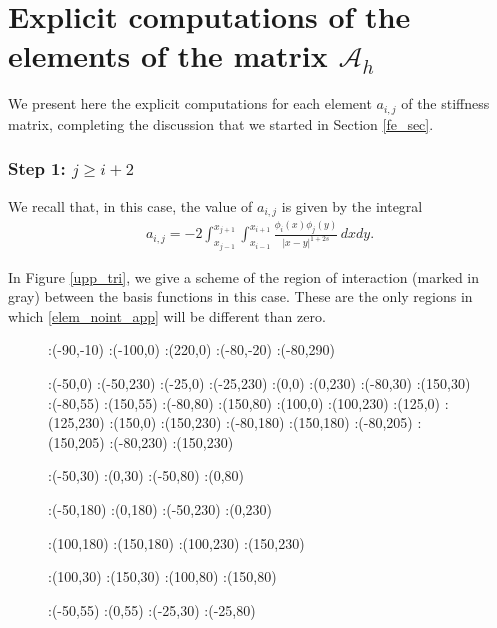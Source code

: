 {\appendix

\section{Explicit computations of the elements of the matrix $\mathcal A_h$}\label{appendix}

We present here the explicit computations for each element $a_{i,j}$ of the stiffness matrix, completing the discussion that we started in Section \ref{fe_sec}.

\subsubsection*{Step 1: $j\geq i+2$}
We recall that, in this case, the value of $a_{i,j}$ is given by the integral
\begin{align}\label{elem_noint_app}
	a_{i,j}=-2 \int_{x_{j-1}}^{x_{j+1}}\int_{x_{i-1}}^{x_{i+1}}\frac{\phi_i(x)\phi_j(y)}{|x-y|^{1+2s}}\,dxdy.
\end{align}

In Figure \ref{upp_tri}, we give a scheme of the region of interaction (marked in gray) between the basis functions in this case. These are the only regions in which \eqref{elem_noint_app} will be different than zero.
\begin{figure}[h]
\figinit{0.7pt}
:(-90,-10)
:(-100,0) :(220,0)
:(-80,-20) :(-80,290)

:(-50,0) :(-50,230)
:(-25,0) :(-25,230)
:(0,0) :(0,230)
%
:(-80,30) :(150,30)
:(-80,55) :(150,55)
:(-80,80) :(150,80)
%
:(100,0) :(100,230)
:(125,0) :(125,230)
:(150,0) :(150,230)
%
:(-80,180) :(150,180)
:(-80,205) :(150,205)
:(-80,230) :(150,230)

:(-50,30) :(0,30)
:(-50,80) :(0,80)

:(-50,180) :(0,180)
:(-50,230) :(0,230)

:(100,180) :(150,180)
:(100,230) :(150,230)

:(100,30) :(150,30)
:(100,80) :(150,80)

:(-50,55) :(0,55)
:(-25,30) :(-25,80)


\end{figure}}

